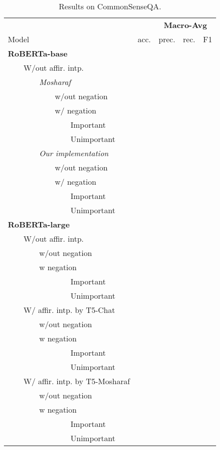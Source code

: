 \begin{table*}
\centering
\begin{tabular}{lrrrr}
\toprule
&& \multicolumn{3}{c}{\textbf{Macro-Avg}} \\
Model & acc. & prec. & rec. & F1 \\
\midrule
\textbf{RoBERTa-base} \\
~~~~W/out affir. intp. \\
~~~~~~~~\textit{Mosharaf} \\
~~~~~~~~~~~~w/out negation \\ 
~~~~~~~~~~~~w/ negation \\ 
~~~~~~~~~~~~~~~~Important \\ 
~~~~~~~~~~~~~~~~Unimportant \\ 
\midrule
~~~~~~~~\textit{Our implementation} \\
~~~~~~~~~~~~w/out negation \\
~~~~~~~~~~~~w/ negation \\ 
~~~~~~~~~~~~~~~~Important \\ 
~~~~~~~~~~~~~~~~Unimportant \\ 
\bottomrule
\textbf{RoBERTa-large} \\
~~~~W/out affir. intp. \\
~~~~~~~~w/out negation \\ 
~~~~~~~~w negation \\ 
~~~~~~~~~~~~~~~~Important \\ 
~~~~~~~~~~~~~~~~Unimportant \\ 
\midrule
~~~~W/ affir. intp. by T5-Chat \\
~~~~~~~~w/out negation \\ 
~~~~~~~~w negation \\ 
~~~~~~~~~~~~~~~~Important \\ 
~~~~~~~~~~~~~~~~Unimportant \\ 
\midrule
~~~~W/ affir. intp. by T5-Mosharaf \\
~~~~~~~~w/out negation \\ 
~~~~~~~~w negation \\ 
~~~~~~~~~~~~~~~~Important \\ 
~~~~~~~~~~~~~~~~Unimportant \\ 
\bottomrule
\end{tabular}
\caption{Results on CommonSenseQA.}
\end{table*}